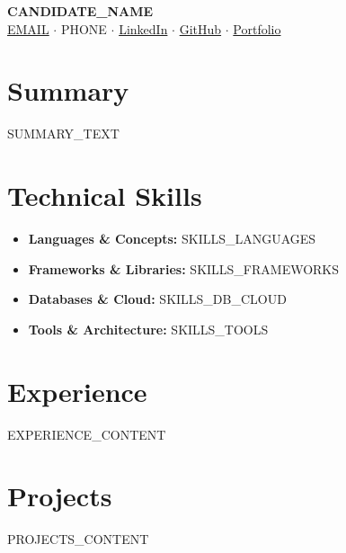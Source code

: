 \documentclass[letterpaper,10pt]{article}
\newcommand{\resumeSubHeadingListStart}{\begin{itemize}[leftmargin=0.15in, label={}]}
\newcommand{\resumeSubHeadingListEnd}{\end{itemize}}
\begin{document}
\begin{center}
    {\Huge \textbf{{{CANDIDATE_NAME}}}} \\
    \vspace{0.3em}
    \href{mailto:{{EMAIL}}}{{{EMAIL}}}
    $\cdot$ {{PHONE}}
    $\cdot$ \href{{{LINKEDIN_URL}}}{LinkedIn}
    $\cdot$ \href{{{GITHUB_URL}}}{GitHub}
    $\cdot$ \href{{{PORTFOLIO_URL}}}{Portfolio}
\end{center}

\vspace{-1em}

\section*{\textbf{Summary}}
\vspace{1.5mm}
\small{{{SUMMARY_TEXT}}}
\vspace{-2.5mm}

\section*{\textbf{Technical Skills}}
\vspace{1.5mm}
\begin{itemize}[leftmargin=*, nosep, itemsep=2pt]
  \item \textbf{Languages \& Concepts:} {{SKILLS_LANGUAGES}}
  \item \textbf{Frameworks \& Libraries:} {{SKILLS_FRAMEWORKS}}
  \item \textbf{Databases \& Cloud:} {{SKILLS_DB_CLOUD}}
  \item \textbf{Tools \& Architecture:} {{SKILLS_TOOLS}}
\end{itemize}
\vspace{-2.5mm}

\section*{\textbf{Experience}}
\vspace{1.5mm}
\resumeSubHeadingListStart
{{EXPERIENCE_CONTENT}}
\resumeSubHeadingListEnd
\vspace{-5.5mm}

\section*{\textbf{Projects}}
\vspace{1.5mm}
\resumeSubHeadingListStart
{{PROJECTS_CONTENT}}
\resumeSubHeadingListEnd
\vspace{-5.5mm}
\end{document}
